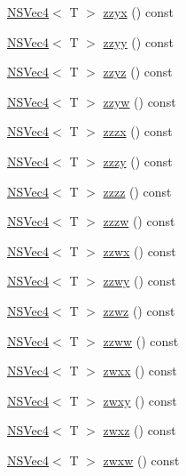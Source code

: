 \begin{DoxyCompactItemize}
\item 
\hyperlink{structNSVec4}{N\-S\-Vec4}$<$ T $>$ \hyperlink{structNSVec4_a1f673f4d5c1722410bd48441ffeedc0a}{zzyx} () const 
\item 
\hyperlink{structNSVec4}{N\-S\-Vec4}$<$ T $>$ \hyperlink{structNSVec4_afdc75059e07234845c3f93595edb57f8}{zzyy} () const 
\item 
\hyperlink{structNSVec4}{N\-S\-Vec4}$<$ T $>$ \hyperlink{structNSVec4_a5c533ff33b68db53a5b5a0077e61e966}{zzyz} () const 
\item 
\hyperlink{structNSVec4}{N\-S\-Vec4}$<$ T $>$ \hyperlink{structNSVec4_ab93f9404bf3c6d9afac2a35301b9ede7}{zzyw} () const 
\item 
\hyperlink{structNSVec4}{N\-S\-Vec4}$<$ T $>$ \hyperlink{structNSVec4_a155385958d24d6caa54ea3c2572a38b2}{zzzx} () const 
\item 
\hyperlink{structNSVec4}{N\-S\-Vec4}$<$ T $>$ \hyperlink{structNSVec4_abf8db9ad3851353a58c7ade636fa87b1}{zzzy} () const 
\item 
\hyperlink{structNSVec4}{N\-S\-Vec4}$<$ T $>$ \hyperlink{structNSVec4_a22b3b6c75d96970c85629e00c1264b25}{zzzz} () const 
\item 
\hyperlink{structNSVec4}{N\-S\-Vec4}$<$ T $>$ \hyperlink{structNSVec4_a5e5a166d6faa0b937c980c0a4ed45d4f}{zzzw} () const 
\item 
\hyperlink{structNSVec4}{N\-S\-Vec4}$<$ T $>$ \hyperlink{structNSVec4_abc2fcd594a3b3e41b7a2b9e57e80a122}{zzwx} () const 
\item 
\hyperlink{structNSVec4}{N\-S\-Vec4}$<$ T $>$ \hyperlink{structNSVec4_a8ab2baef33b1bf99687efd056eb58a9d}{zzwy} () const 
\item 
\hyperlink{structNSVec4}{N\-S\-Vec4}$<$ T $>$ \hyperlink{structNSVec4_a6e4e11d956e1305970f5682a0934ea3e}{zzwz} () const 
\item 
\hyperlink{structNSVec4}{N\-S\-Vec4}$<$ T $>$ \hyperlink{structNSVec4_ac1944e9ce95401c2bf6b15e21c5ae104}{zzww} () const 
\item 
\hyperlink{structNSVec4}{N\-S\-Vec4}$<$ T $>$ \hyperlink{structNSVec4_a829d24d2e687853f48a727c03ce0f8d1}{zwxx} () const 
\item 
\hyperlink{structNSVec4}{N\-S\-Vec4}$<$ T $>$ \hyperlink{structNSVec4_a2cb2104738e7ccb23bfeb88706649b6d}{zwxy} () const 
\item 
\hyperlink{structNSVec4}{N\-S\-Vec4}$<$ T $>$ \hyperlink{structNSVec4_ac195e5e8665e32cb6f09989258b027f2}{zwxz} () const 
\item 
\hyperlink{structNSVec4}{N\-S\-Vec4}$<$ T $>$ \hyperlink{structNSVec4_af4a2f218d6d6acf105c6b435b2885a05}{zwxw} () const 

\end{DoxyCompactItemize}

